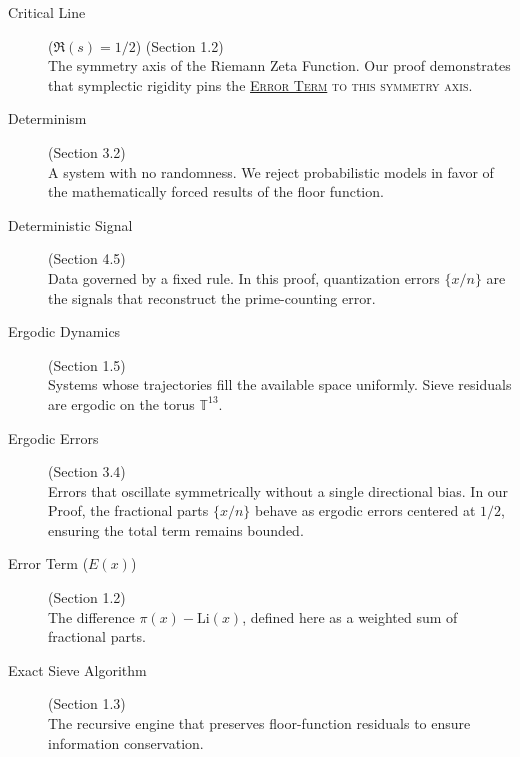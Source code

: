 \documentclass[sn-mathphys-num, pdflatex, referee]{sn-jnl}
\newcommand{\gterm}[2]{\begingroup\normalfont\scshape\hyperlink{#1}{#2}\endgroup}
\begin{document}
\begin{description}
    \item[Critical Line] \hypertarget{critical_line}{}\label{gloss:criticalline} ($\Re(s) = 1/2$) (Section 1.2) \hfill \\
    The symmetry axis of the Riemann Zeta Function. Our proof demonstrates that symplectic rigidity pins the \gterm{error_term}{Error Term} to this symmetry axis.

    \item[Determinism] \hypertarget{deterministic}{}\label{gloss:determinism} (Section 3.2) \hfill \\
    A system with no randomness. We reject probabilistic models in favor of the mathematically forced results of the floor function.

    \item[Deterministic Signal] \hypertarget{deterministic_signal}{}\label{gloss:detsignal} (Section 4.5) \hfill \\
    Data governed by a fixed rule. In this proof, quantization errors $\{x/n\}$ are the signals that reconstruct the prime-counting error.

    \item[Ergodic Dynamics] \hypertarget{ergodic}{}\label{gloss:ergodicdynamics} (Section 1.5) \hfill \\
    Systems whose trajectories fill the available space uniformly. Sieve residuals are ergodic on the torus $\mathbb{T}^{13}$.

    \item[Ergodic Errors] \hypertarget{ergodic_errors}{}\label{gloss:ergodicerrors} (Section 3.4) \hfill \\
    Errors that oscillate symmetrically without a single directional bias. In our Proof, the fractional parts $\{x/n\}$ behave as ergodic errors centered at $1/2$, ensuring the total term remains bounded.

    \item[Error Term \texorpdfstring{($E(x)$)}{(E(x))}] \hypertarget{error_term}{}\label{gloss:errorterm} (Section 1.2) \hfill \\
    The difference $\pi(x) - \text{Li}(x)$, defined here as a weighted sum of fractional parts.

    \item[Exact Sieve Algorithm] \hypertarget{exact_sieve}{}\label{gloss:exactsieve} (Section 1.3) \hfill \\
    The recursive engine that preserves floor-function residuals to ensure information conservation.


\end{description}
\end{document}
